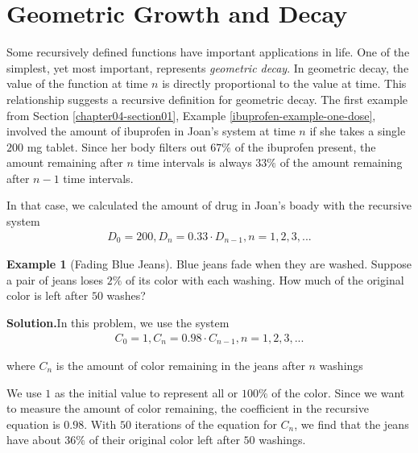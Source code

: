 \documentclass[10pt,]{book}
\theoremstyle{plain}
\theoremstyle{definition}
\theoremstyle{definition}
\newtheorem{example}[theorem]{Example}
\theoremstyle{definition}
\numberwithin{equation}{section}
\begin{document}
\section[{Geometric Growth and Decay}]{Geometric Growth and Decay}\label{chapter04-section03}
Some recursively defined functions have important applications in life.  One of the simplest, yet most important, represents \emph{geometric decay}. In geometric decay, the value of the function at time \(n\) is directly proportional to the value at time. This relationship suggests a recursive definition for geometric decay. The first example from Section \hyperref[chapter04-section01]{\ref{chapter04-section01}}, Example \hyperref[ibuprofen-example-one-dose]{\ref{ibuprofen-example-one-dose}}, involved the amount of ibuprofen in Joan's system at time \(n\) if she takes a single \(200\) mg tablet. Since her body filters out \(67\%\) of the ibuprofen present, the amount remaining after \(n\) time intervals is always \(33\%\) of the amount remaining after \(n-1\) time intervals.%
\par
In that case, we calculated the amount of drug in Joan's boady with the recursive system%
%
\begin{gather*}
D_0=200, D_n=0.33 \cdot D_{n-1}, n=1,2,3,...
\end{gather*}
\begin{example}[Fading Blue Jeans]\label{example-fading-blue-jeans}
Blue jeans fade when they are washed. Suppose a pair of jeans loses \(2\%\) of its color with each washing.  How much of the original color is left after \(50\) washes?%
\par\medskip\noindent%
\textbf{Solution.}\quad In this problem, we use the system%
%
\begin{gather*}
C_0=1, C_n=0.98 \cdot C_{n-1}, n=1,2,3,...
\end{gather*}
\par
where \(C_n\) is the amount of color remaining in the jeans after \(n\) washings%
\par
We use \(1\) as the initial value to represent all or \(100\%\) of the color.  Since we want to measure the amount of color remaining, the coefficient in the recursive equation is \(0.98\).  With \(50\) iterations of the equation for \(C_n\), we find that the jeans have about \(36\%\) of their original color left after \(50\) washings.%
\end{example}
\end{document}
